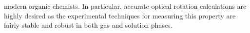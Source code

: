 modern organic chemists. In particular, accurate optical rotation calculations are highly desired 
as the experimental techniques for measuring this property are fairly stable and robust in 
both gas and solution phases.
\\
